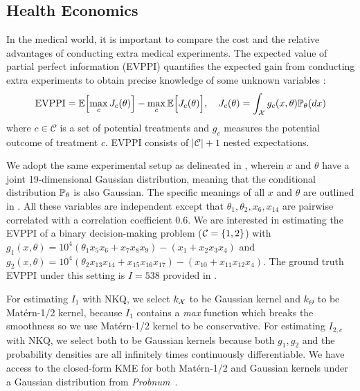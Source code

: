\subsection{Health Economics}\label{sec:decision}
In the medical world, it is important to compare the cost and the relative advantages of conducting extra medical experiments. 
The expected value of partial perfect information (EVPPI) quantifies the expected gain from conducting extra experiments to obtain precise knowledge of some unknown variables \citep{brennan2007calculating}:
\begin{align*}
    \text{EVPPI} = \operatorname{\mathbb{E}} \Bigl[\max_c J_c(\theta) \Bigr] - \max_c \operatorname{\mathbb{E}} \Bigl[J_c(\theta) \Bigr], \quad J_c(\theta) = \int_{\mathcal{X}} g_c(x, \theta) \mathbb{P}_\theta(dx)
\end{align*}
where $c \in \mathcal{C}$ is a set of potential treatments and $g_c$ measures the potential outcome of treatment $c$. EVPPI consists of $|\mathcal{C}| + 1$ nested expectations.

We adopt the same experimental setup as delineated in \cite{Giles2019}, wherein $x$ and $\theta$ have a joint 19-dimensional Gaussian distribution, meaning that the conditional distribution $\mathbb{P}_\theta$ is also Gaussian. 
The specific meanings of all $x$ and $\theta$ are outlined in .
All these variables are independent except that $\theta_1, \theta_2, x_6, x_{14}$ are pairwise correlated with a correlation coefficient $0.6$.
We are interested in estimating the EVPPI of a binary decision-making problem ($\mathcal{C} = \{1, 2\}$) with $g_1(x, \theta)=10^4 (\theta_1 x_5 x_6 + x_7 x_8 x_{9})-(x_1 + x_2 x_3 x_4)$ and $g_2(x, \theta) = 10^4 (\theta_2 x_{13} x_{14} + x_{15} x_{16} x_{17})-(x_{10} + x_{11} x_{12} x_4)$. 
The ground truth EVPPI under this setting is $I=538$ provided in \cite{giles2019decision}.

For estimating $I_1$ with NKQ, we select $k_{\mathcal{X}}$ to be Gaussian kernel and $k_\Theta$ to be Mat\'ern-1/2 kernel, because $I_1$ contains a \textit{max} function which breaks the smoothness so we use Mat\'ern-1/2 kernel to be conservative. 
For estimating $I_{2,c}$ with NKQ, we select both to be Gaussian kernels because both $g_1, g_2$ and the probability densities are all infinitely times continuously differentiable. 
We have access to the closed-form KME for both Mat\'ern-1/2 and Gaussian kernels under a Gaussian distribution from \textit{Probnum}~\cite{Wenger2021}.

